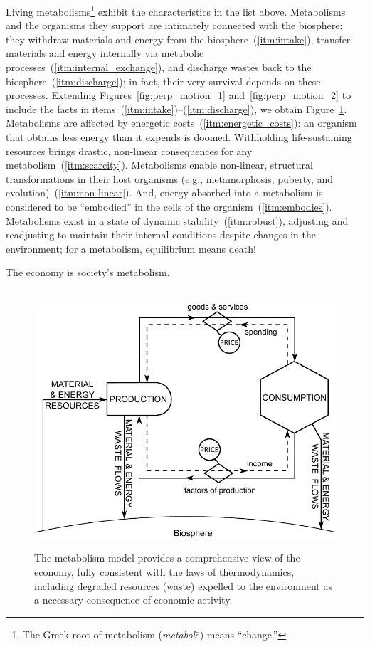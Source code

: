 Living metabolisms\footnote{The 
	Greek root of metabolism 
	(\emph{metabol$\bar{e}$}) means ``change.''}
exhibit the characteristics in the list above.
Metabolisms and the organisms they support
are intimately connected with the biosphere:
they withdraw materials and energy from the biosphere~(\ref{itm:intake}), 
transfer materials and energy internally via metabolic processes~(\ref{itm:internal_exchange}),
and discharge wastes back to the biosphere~(\ref{itm:discharge});
in fact, their very survival depends on these processes.
Extending Figures~\ref{fig:perp_motion_1} and~\ref{fig:perp_motion_2}
to include the facts in items~(\ref{itm:intake})--(\ref{itm:discharge}), %
we obtain Figure~\ref{fig:metabolic_economy}.
Metabolisms are affected by energetic costs~(\ref{itm:energetic_costs}): 
an organism that obtains less energy than it expends is doomed.
Withholding life-sustaining resources brings drastic, non-linear
consequences for any metabolism~(\ref{itm:scarcity}).
Metabolisms enable non-linear, structural transformations
in their host organisms (e.g., metamorphosis, puberty, and evolution)~(\ref{itm:non-linear}).
And, energy absorbed into a metabolism is considered to be ``embodied''
in the cells of the organism~(\ref{itm:embodies}).
Metabolisms exist in a state of dynamic stability~(\ref{itm:robust}),
adjusting and readjusting to maintain their internal conditions
despite changes in the environment;
for a metabolism, equilibrium means death!

The economy is society's metabolism.\cite{F-K1998, Giampietro2000, Giampietro2013}

\begin{figure}[!ht]
\centering\
\includegraphics[width=\linewidth]{Part_0/Chapter_Introduction/images/PERKS.pdf}
\caption[The metabolism model]{The metabolism model provides a comprehensive view 
of the economy, fully consistent with the laws of thermodynamics, 
including degraded resources (waste) expelled 
to the environment as a necessary consequence of economic activity.}
\label{fig:metabolic_economy}
\end{figure}


